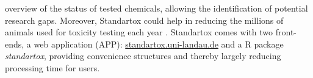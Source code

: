 overview of the status of tested chemicals, allowing the identification of potential research gaps. Moreover, Standartox could help in reducing the millions of animals used for toxicity testing each year \citep{hartung_chemical_2009}. Standartox comes with two front-ends, a web application (APP): \url{standartox.uni-landau.de} and a R \citep{rcoreteam_language_2017} package \textit{standartox}, providing convenience structures and thereby largely reducing processing time for users.

